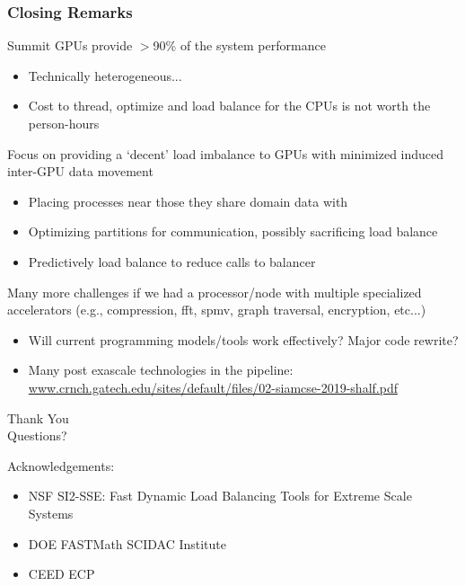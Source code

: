 \documentclass[aspectratio=169]{beamer}
\begin{document}
\begin{frame}
  \frametitle{Closing Remarks}
  Summit GPUs provide $>$90\% of the system performance
  \begin{itemize}
    \item Technically heterogeneous...
    \item Cost to thread, optimize and load balance for the CPUs is not worth
      the person-hours
  \end{itemize}
  Focus on providing a `decent' load imbalance to GPUs with minimized induced inter-GPU data movement
  \begin{itemize}
    \item Placing processes near those they share domain data with
    \item Optimizing partitions for communication, possibly sacrificing load balance
    \item Predictively load balance to reduce calls to balancer
  \end{itemize}
  Many more challenges if we had a processor/node with multiple specialized accelerators
  (e.g., compression, fft, spmv, graph traversal, encryption, etc...)
  \begin{itemize}
    \item Will current programming models/tools work effectively? Major code rewrite?
    \item Many post exascale technologies in the pipeline:
      \url{www.crnch.gatech.edu/sites/default/files/02-siamcse-2019-shalf.pdf}
  \end{itemize}
\end{frame}

\begin{frame}
  \begin{center}
    {\huge
      Thank You\\
      \bigskip
      \bigskip
      \bigskip
      \bigskip
      \bigskip
      \huge
      Questions?\\
      \bigskip
      \bigskip
      \bigskip
    }
  \end{center}
  \large
  Acknowledgements:\\
  \begin{itemize}
    \item NSF SI2-SSE: Fast Dynamic Load Balancing Tools for Extreme Scale Systems
    \item DOE FASTMath SCIDAC Institute
    \item CEED ECP
  \end{itemize}
\end{frame}
\end{document}

